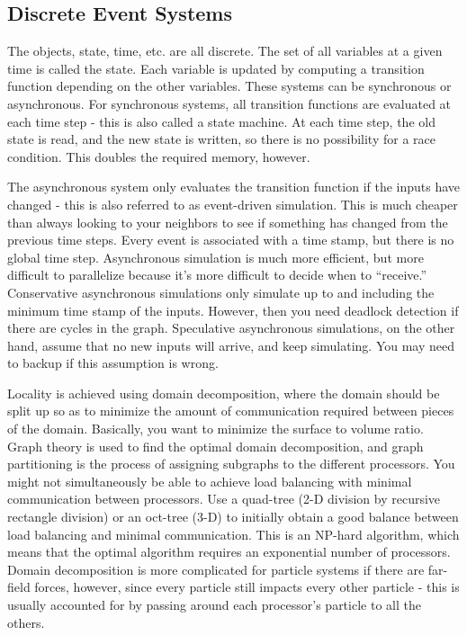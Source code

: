 \documentclass[10pt]{article}
\begin{document}
\begin{flushleft}
\subsection{Discrete Event Systems}

The objects, state, time, etc. are all discrete. The set of all variables at a given time is called the state. Each variable is updated by computing a transition function depending on the other variables. These systems can be synchronous or asynchronous. For synchronous systems, all transition functions are evaluated at each time step - this is also called a state machine. At each time step, the old state is read, and the new state is written, so there is no possibility for a race condition. This doubles the required memory, however. 

The asynchronous system only evaluates the transition function if the inputs have changed - this is also referred to as event-driven simulation. This is much cheaper than always looking to your neighbors to see if something has changed from the previous time steps. Every event is associated with a time stamp, but there is no global time step. Asynchronous simulation is much more efficient, but more difficult to parallelize because it's more difficult to decide when to ``receive.'' Conservative asynchronous simulations only simulate up to and including the minimum time stamp of the inputs. However, then you need deadlock detection if there are cycles in the graph. Speculative asynchronous simulations, on the other hand, assume that no new inputs will arrive, and keep simulating. You may need to backup if this assumption is wrong. 

Locality is achieved using domain decomposition, where the domain should be split up so as to minimize the amount of communication required between pieces of the domain. Basically, you want to minimize the surface to volume ratio. Graph theory is used to find the optimal domain decomposition, and graph partitioning is the process of assigning subgraphs to the different processors. You might not simultaneously be able to achieve load balancing with minimal communication between processors. Use a quad-tree (2-D division by recursive rectangle division) or an oct-tree (3-D) to initially obtain a good balance between load balancing and minimal communication. This is an NP-hard algorithm, which means that the optimal algorithm requires an exponential number of processors. Domain decomposition is more complicated for particle systems if there are far-field forces, however, since every particle still impacts every other particle - this is usually accounted for by passing around each processor's particle to all the others. 


\end{flushleft}
\end{document}
